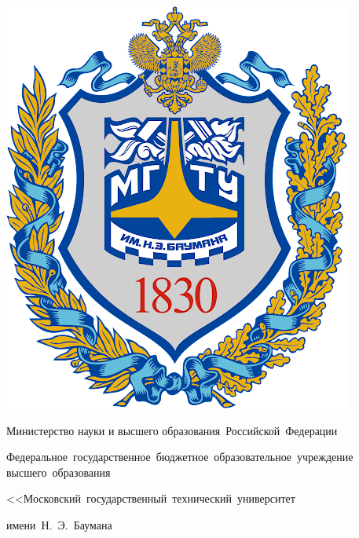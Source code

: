 \begin{titlepage}
    \fontsize{12pt}{12pt}\selectfont

    \noindent
    \begin{center}
        \begin{minipage}{0.14\textwidth}
            \includegraphics[width=\linewidth]{assets/logo.png}
        \end{minipage}
        \hfill
        \begin{minipage}{0.85\textwidth}\centering\bfseries
            {
                \linespread{1}\selectfont
                \vspace{0.1cm}
                {Министерство науки и высшего образования~Российской~Федерации}

                {Федеральное~государственное~бюджетное~образовательное~учреждение высшего~образования}

                {
                    <<Московский~государственный~технический~университет

                имени~Н.~Э.~Баумана

}}
\end{minipage}
\end{center}
\end{titlepage}

